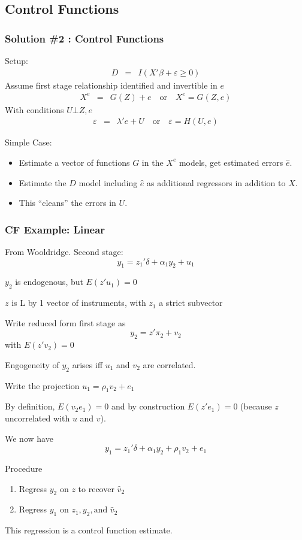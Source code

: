 \documentclass[11pt,dvipsnames,table,aspectratio=169]{beamer}
\begin{document}
\subsection{Control Functions}

       
\begin{frame}
\frametitle{Solution \#2 : Control Functions}
Setup: 
\begin{eqnarray*}
D &=& I ( X' \beta + \varepsilon \geq 0 ) 
\end{eqnarray*}
Assume first stage relationship identified and invertible in $e$
\begin{eqnarray*}
X^e &=& G(Z) +e  \quad \mbox{or}  \quad  X^e = G(Z,e)
\end{eqnarray*}
With conditions $ U \bot Z,e$
\begin{eqnarray*}
\varepsilon  &=&\lambda' e + U \quad \mbox{or}  \quad  \varepsilon = H(U,e) 
\end{eqnarray*}
       
Simple Case:
\begin{itemize}
\item Estimate a vector of functions $G$ in the $X^e$ models, get estimated errors $\hat{e}$.
\item Estimate the $D$ model including $\hat{e}$ as additional regressors in addition to $X$.
\item This ``cleans'' the errors in $U$.
\end{itemize}
\end{frame}

\begin{frame}[allowframebreaks]
       \frametitle{CF Example: Linear}
       From Wooldridge. Second stage: 
       $$y_1 = z_1'\delta + \alpha_1 y_2 + u_1$$ 

       $y_2$ is endogenous, but $E(z'u_1)=0$ 

       \medskip
       $z$ is L by 1 vector of instruments, with $z_1$ a strict subvector

       \medskip
       Write reduced form first stage as $$y_2 = z'\pi_2 + v_2$$ with $E(z'v_2)=0$

       \medskip
       Engogeneity of $y_2$ arises iff $u_1$ and $v_2$ are correlated.  

       \framebreak

       Write the projection $u_1 = \rho_1 v_2 + e_1$ 

       \medskip

       By definition, $E(v_2 e_1)=0$ and by construction $E(z'e_1)=0$ (because $z$ uncorrelated with $u$ and $v$). 

       \medskip

       We now have $$y_1 = z_1'\delta + \alpha_1 y_2 + \rho_1 v_2 + e_1$$

       Procedure
       \begin{enumerate}
              \item Regress $y_2$ on $z$ to recover $\hat v_2$ 
              \item Regress $y_1$ on $z_1, y_2, \mbox{and } \hat v_2$
       \end{enumerate}
       This regression is a \alert{control function} estimate. 
\end{frame}
\end{document}
